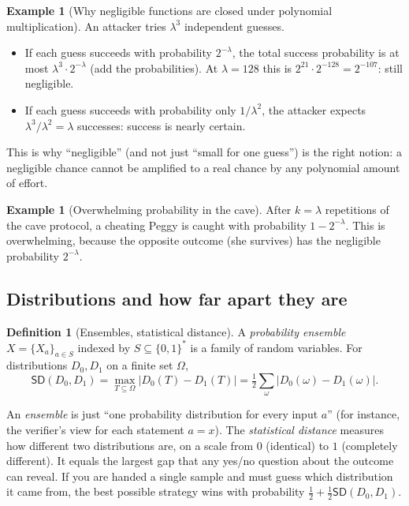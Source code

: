\documentclass[11pt,a4paper]{report}
\theoremstyle{plain}
\theoremstyle{definition}
\newtheorem{definition}[theorem]{Definition}
\newtheorem{example}[theorem]{Example}
\theoremstyle{remark}
\newcommand{\SD}{\mathsf{SD}}
\begin{document}
\begin{example}[Why negligible functions are closed under polynomial multiplication]
An attacker tries $\lambda^3$ independent guesses.
\begin{itemize}
\item If each guess succeeds with probability $2^{-\lambda}$, the total success probability is at most $\lambda^3\cdot2^{-\lambda}$ (add the probabilities). At $\lambda=128$ this is $2^{21}\cdot2^{-128}=2^{-107}$: still negligible.
\item If each guess succeeds with probability only $1/\lambda^2$, the attacker expects $\lambda^3/\lambda^2=\lambda$ successes: success is nearly certain.
\end{itemize}
This is why ``negligible'' (and not just ``small for one guess'') is the right notion: a negligible chance cannot be amplified to a real chance by any polynomial amount of effort.
\end{example}

\begin{example}[Overwhelming probability in the cave]
After $k=\lambda$ repetitions of the cave protocol, a cheating Peggy is caught with probability $1-2^{-\lambda}$. This is overwhelming, because the opposite outcome (she survives) has the negligible probability $2^{-\lambda}$.
\end{example}

\subsection{Distributions and how far apart they are}
\begin{definition}[Ensembles, statistical distance]
A \emph{probability ensemble} $X=\{X_{a}\}_{a\in S}$ indexed by $S\subseteq\{0,1\}^*$ is a family of random variables. For distributions $D_0,D_1$ on a finite set $\Omega$,
\[\SD(D_0,D_1)=\max_{T\subseteq\Omega}\big|D_0(T)-D_1(T)\big|=\tfrac12\sum_{\omega}|D_0(\omega)-D_1(\omega)|.\]
\end{definition}
\begin{plain}\PE
An \emph{ensemble} is just ``one probability distribution for every input $a$'' (for instance, the verifier's view for each statement $a=x$). The \emph{statistical distance} measures how different two distributions are, on a scale from $0$ (identical) to $1$ (completely different). It equals the largest gap that any yes/no question about the outcome can reveal. If you are handed a single sample and must guess which distribution it came from, the best possible strategy wins with probability $\tfrac12+\tfrac12\SD(D_0,D_1)$.
\end{plain}
\end{document}
